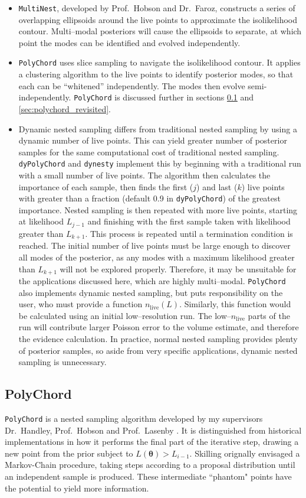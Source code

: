 \documentclass{article}
\begin{document}
\begin{itemize}
  \item \texttt{MultiNest}, developed by Prof.~Hobson and Dr.~Faroz, constructs a series of overlapping ellipsoids around the live points to approximate the isolikelihood contour. Multi--modal posteriors will cause the ellipsoids to separate, at which point the modes can be identified and evolved independently. 
  \item \texttt{PolyChord} uses slice sampling to navigate the isolikelihood contour. It applies a clustering algorithm to the live points to identify posterior modes, so that each can be ``whitened'' independently. The modes then evolve semi-independently. \texttt{PolyChord} is discussed further in sections \ref{sec:poly} and \ref{sec:polychord_revisited}.
  \item Dynamic nested sampling differs from traditional nested sampling by using a dynamic number of live points. This can yield greater number of posterior samples for the same computational cost of traditional nested sampling. \texttt{dyPolyChord} and \texttt{dynesty} implement this by beginning with a traditional run with a small number of live points. The algorithm then calculates the importance of each sample, then finds the first ($j$) and last ($k$) live points with greater than a fraction (default 0.9 in \texttt{dyPolyChord}) of the greatest importance. Nested sampling is then repeated with more live points, starting at likelihood $L_{j-1}$ and finishing with the first sample taken with likelihood greater than $L_{k+1}$. This process is repeated until a termination condition is reached. The initial number of live points must be large enough to discover all modes of the posterior, as any modes with a maximum likelihood greater than $L_{k+1}$ will not be explored properly. Therefore, it may be unsuitable for the applications discussed here, which are highly multi--modal. \texttt{PolyChord} also implements dynamic nested sampling, but puts responsibility on the user, who must provide a function $n_\textrm{live}(L)$. Similarly, this function would be calculated using an initial low--resolution run. The low--$n_\textrm{live}$ parts of the run will contribute larger Poisson error to the volume estimate, and therefore the evidence calculation. In practice, normal nested sampling provides plenty of posterior samples, so aside from very specific applications, dynamic nested sampling is unnecessary.
\end{itemize}


\subsection{PolyChord}
\label{sec:poly}
\texttt{PolyChord} is a nested sampling algorithm developed by my supervisors Dr.~Handley, Prof.~Hobson and Prof.~Lasenby \cite{PolyChord_1, PolyChord_2}. It is distinguished from historical implementations in how it performs the final part of the iterative step, drawing a new point from the prior subject to $L(\bm\theta)>L_{i-1}$. Skilling orignally envisaged a Markov-Chain procedure, taking steps according to a proposal distribution until an independent sample is produced. These intermediate ``phantom" points have the potential to yield more information.
\end{document}
